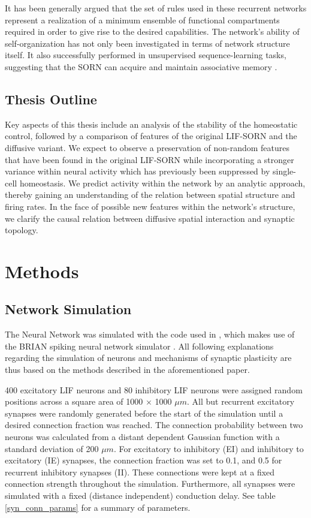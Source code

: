 \documentclass[10pt,a4paper]{article}
\begin{document}
It has been generally argued that the set of rules used in these recurrent networks represent a realization of a minimum ensemble of functional compartments required in order to give rise to the desired capabilities. The network's ability of self-organization has not only been investigated in terms of network structure itself. It also successfully performed in unsupervised sequence-learning tasks, suggesting that the SORN can acquire and maintain associative memory \cite{Hartmann_2016}.  

 
\subsection{Thesis Outline}
Key aspects of this thesis include an analysis of the stability of the homeostatic control, followed by a comparison of features of the original LIF-SORN and the diffusive variant. We expect to observe a preservation of non-random features that have been found in the original LIF-SORN while incorporating a stronger variance within neural activity which has previously been suppressed by single-cell homeostasis. We predict activity within the network by an analytic approach, thereby gaining an understanding of the relation between spatial structure and firing rates. In the face of possible new features within the network's structure, we clarify the causal relation between diffusive spatial interaction and synaptic topology.

\section{Methods} \label{methods}
\subsection{Network Simulation} \label{network simulation}

The Neural Network was simulated with the code used in \cite{SORN_Paper}, which makes use of the BRIAN spiking neural network simulator \cite{Briansim}. All following explanations regarding the simulation of neurons and mechanisms of synaptic plasticity are thus based on the methods described in the aforementioned paper.

400 excitatory LIF neurons and 80 inhibitory LIF neurons were assigned random positions across a square area of 1000 $\times$ 1000 $\mu m$. All but recurrent excitatory synapses were randomly generated before the start of the simulation until a desired connection fraction was reached. The connection probability between two neurons was calculated from a distant dependent Gaussian function with a standard deviation of 200 $\mu m$. For excitatory to inhibitory (EI) and inhibitory to excitatory (IE) synapses, the connection fraction was set to 0.1, and 0.5 for recurrent inhibitory synapses (II). These connections were kept at a fixed connection strength throughout the simulation. Furthermore, all synapses were simulated with a fixed (distance independent) conduction delay. See table \ref{syn_conn_params} for a summary of parameters.
\end{document}
